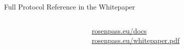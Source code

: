 \begin{frame}{Full Protocol Reference in the Whitepaper}
  \begin{columns}[c,fullwidth]

    \begin{column}{.65\linewidth}
    \end{column}

    \begin{column}{.35\linewidth}
      \url{rosenpass.eu/docs}
      \\ \url{rosenpass.eu/whitepaper.pdf}
    \end{column}

  \end{columns}
\end{frame}
